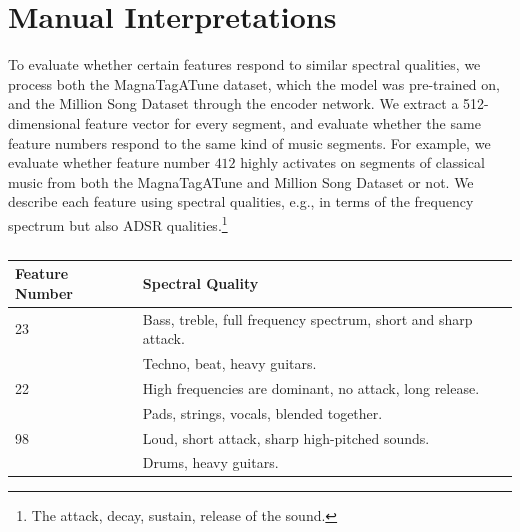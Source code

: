 \section{Manual Interpretations}
To evaluate whether certain features respond to similar spectral qualities, we process both the MagnaTagATune dataset, which the model was pre-trained on, and the Million Song Dataset through the encoder network. We extract a 512-dimensional feature vector for every segment, and evaluate whether the same feature numbers respond to the same kind of music segments. For example, we evaluate whether feature number $412$ highly activates on segments of classical music from both the MagnaTagATune and Million Song Dataset or not. We describe each feature using spectral qualities, e.g., in terms of the frequency spectrum but also ADSR qualities.\footnote{The attack, decay, sustain, release of the sound.}

\begin{table}
    \centering
    \begin{tabular}{ll}
        \toprule Feature Number & Spectral Quality \\\hline
        23 & Bass, treble, full frequency spectrum, short and sharp attack.\\
        & Techno, beat, heavy guitars. \\
        22 & High frequencies are dominant, no attack, long release.\\
        & Pads, strings, vocals, blended together.\\
        98 & Loud, short attack, sharp high-pitched sounds.\\
        & Drums, heavy guitars.\\
        \bottomrule
    \end{tabular}
    \caption{}
    \label{tab:manual_interpretation}
\end{table}


